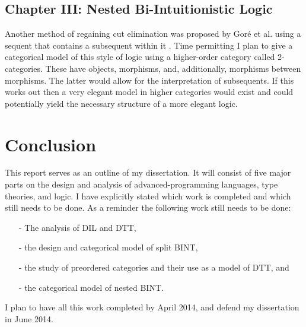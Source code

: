 \subsection{Chapter III: Nested Bi-Intuitionistic Logic}
\label{subsec:nested_bi-intuitionistic_logic}
Another method of regaining cut elimination was proposed by Gor\'e et
al. using a sequent that contains a subsequent within
it \cite{Gore:2010}.  Time permitting I plan to give a categorical
model of this style of logic using a higher-order category called
2-categories.  These have objects, morphisms, and, additionally,
morphisms between morphisms.  The latter would allow for the
interpretation of subsequents. If this works out then a very elegant
model in higher categories would exist and could potentially yield the
necessary structure of a more elegant logic.

\section{Conclusion}
\label{sec:conclusion}
This report serves as an outline of my dissertation.  It will consist
of five major parts on the design and analysis of advanced-programming
languages, type theories, and logic.  I have explicitly stated which
work is completed and which still needs to be done.  As a reminder the
following work still needs to be done:
\begin{itemize}
\item[-] The analysis of DIL and DTT,
\item[-] the design and categorical model of split BINT,
\item[-] the study of preordered categories and their use as a model of DTT, and
\item[-] the categorical model of nested BINT.
\end{itemize}
I plan to have all this work completed by April 2014, and defend my
dissertation in June 2014.

 

